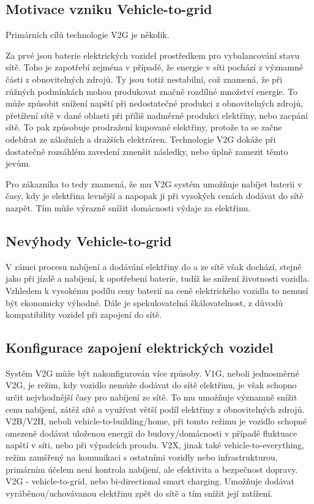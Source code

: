 \documentclass[12pt,a4paper]{article}
\begin{document}
\subsection{Motivace vzniku Vehicle-to-grid}
Primárních cílů technologie V2G je několik. 

Za prvé jsou baterie elektrických vozidel prostředkem pro vybalancování stavu sítě. 
Toho je zapotřebí zejména v případě, že energie v síti pochází z významné části z obnovitelných zdrojů. 
Ty jsou totiž nestabilní, což znamená, že při růžných podmínkách mohou produkovat značně rozdílné množství energie. 
To může způsobit snížení napští při nedostatečné produkci z obnovitelných zdrojů, 
přetížení sítě v dané oblasti při příliš nadměrné produkci elektřiny, nebo zacpání sítě. 
To pak způsobuje prodražení kupované elektřiny, protože ta se začne odebírat ze záložních a dražších elektráren. 
Technologie V2G dokáže při dostatečně rozsáhlém zavedení zmenšit následky, nebo úplně zamezit těmto jevům.
\cite{GREAKER2022101310}

Pro zákazníka to tedy znamená, že mu V2G systém umožňuje nabíjet baterii v časy, 
kdy je elektřina levnější a napopak ji při vysokých cenách dodávat do sítě nazpět. 
Tím může výrazně snížit domácnosti výdaje za elektřinu.
\cite{virta-ltd-2021}

\subsection{Nevýhody Vehicle-to-grid}
V rámci procesu nabíjení a dodávání elektřiny do a ze sítě však dochází, stejně jako při jízdě a nabíjení, 
k opotřebení baterie, tudíž ke snížení životnosti vozidla. 
Vzhledem k vysokému podílu ceny baterií na ceně elektrického vozidla to nemusí být ekonomicky výhodné.
Dále je spekulovatelná škálovatelnost, z důvodů kompatibility vozidel při zapojení do sítě.
\cite{V2Gtransfer}

\subsection{Konfigurace zapojení elektrických vozidel}
Systém V2G může být nakonfigurován více způsoby.
V1G, neboli jednosměrné V2G, je režim, kdy vozidlo nemůže dodávat do sítě elektřinu,
je však schopno určit nejvhodnější časy pro nabíjení ze sítě. To mu umožňuje významně snížit cenu nabíjení, zátěž sítě a využívat větší podíl elektřiny z obnovitelných zdrojů.
V2B/V2H, neboli vehicle-to-building/home, při tomto režimu je vozidlo schopné omezeně dodávat uloženou energii do budovy/domácnosti v případě fluktuace napští v síti, nebo při výpadcích proudu.
V2X, jinak také vehicle-to-everything, režim zamšřený na komunikaci s ostatními vozidly nebo infrastrukturou, primárním účelem není kontrola nabíjení, ale efektivita a bezpečnost dopravy.
V2G - vehicle-to-grid, nebo bi-directional smart charging. Umožňuje dodávat vyráběnou/uchovávanou elektřinu zpět do sítě a tím snížit její zatížení.
\end{document}
